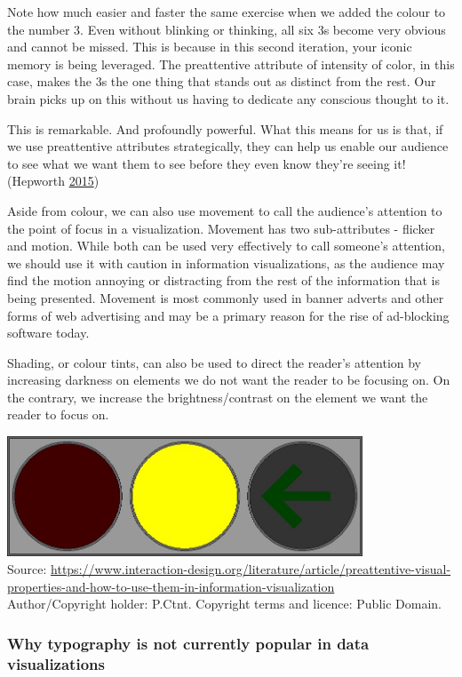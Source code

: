 \documentclass[]{book}
\begin{document}
Note how much easier and faster the same exercise when we added the colour to the number 3. Even without blinking or thinking, all six 3s become very obvious and cannot be missed. This is because in this second iteration, your iconic memory is being leveraged. The preattentive attribute of intensity of color, in this case, makes the 3s the one thing that stands out as distinct from the rest. Our brain picks up on this without us having to dedicate any conscious thought to it.

This is remarkable. And profoundly powerful. What this means for us is that, if we use preattentive attributes strategically, they can help us enable our audience to see what we want them to see before they even know they're seeing it! (Hepworth \protect\hyperlink{ref-kathep}{2015})

Aside from colour, we can also use movement to call the audience's attention to the point of focus in a visualization. Movement has two sub-attributes - flicker and motion. While both can be used very effectively to call someone's attention, we should use it with caution in information visualizations, as the audience may find the motion annoying or distracting from the rest of the information that is being presented. Movement is most commonly used in banner adverts and other forms of web advertising and may be a primary reason for the rise of ad-blocking software today.

Shading, or colour tints, can also be used to direct the reader's attention by increasing darkness on elements we do not want the reader to be focusing on. On the contrary, we increase the brightness/contrast on the element we want the reader to focus on.

\includegraphics[width=4.16667in,height=\textheight]{images/preattentive-attr-shading.jpg}\\
Source: \url{https://www.interaction-design.org/literature/article/preattentive-visual-properties-and-how-to-use-them-in-information-visualization}\\
Author/Copyright holder: P.Ctnt. Copyright terms and licence: Public Domain.

\hypertarget{why-typography-is-not-currently-popular-in-data-visualizations}{%
\subsubsection{Why typography is not currently popular in data visualizations}\label{why-typography-is-not-currently-popular-in-data-visualizations}}
\end{document}
